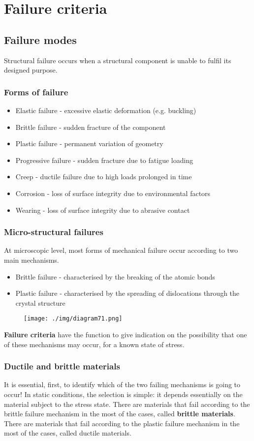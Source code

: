 \chapter{Failure criteria}
\section{Failure modes}
Structural failure occurs when a structural component is unable to fulfil its designed purpose.
\subsection{Forms of failure}
\begin{itemize}
  \item Elastic failure - excessive elastic deformation (e.g. buckling)
  \item Brittle failure - sudden fracture of the component
  \item Plastic failure - permanent variation of geometry
  \item Progressive failure - sudden fracture due to fatigue loading
  \item Creep - ductile failure due to high loads prolonged in time
  \item Corrosion - loss of surface integrity due to environmental factors
  \item Wearing - loss of surface integrity due to abrasive contact
\end{itemize}
\subsection{Micro-structural failures}
At microscopic level, most forms of mechanical failure occur according to two main mechanisms.
\begin{itemize}
  \item Brittle failure - characterised by the breaking of the atomic bonds
  \item Plastic failure - characterised by the spreading of dislocations through the crystal structure
\end{itemize}
\begin{figure}[H]
  \centering
  \texttt{[image: ./img/diagram71.png]}
  \caption{}
\end{figure}
\textbf{Failure criteria} have the function to give indication on the possibility that one of these mechanisms may occur, for a known state of stress.
\subsection{Ductile and brittle materials}
It is essential, first, to identify which of the two failing mechanisms is going to occur! In static conditions, the selection is simple: it depends essentially on the material subject to the stress state. There are materials that fail according to the brittle failure mechanism in the most of the cases, called \textbf{brittle materials}. There are materials that fail according to the plastic failure mechanism in the most of the cases, called ductile materials.

